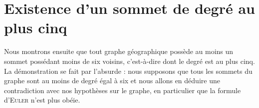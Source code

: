 \section{Existence d'un sommet de degré au plus cinq}\label{Existence}

Nous montrons ensuite que tout graphe géographique possède au moins un sommet possédant moins de six voisins, c'est-à-dire dont le degré est au plus cinq. La démonstration se fait par l'absurde : nous supposons que tous les sommets du graphe sont au moins de degré égal à six et nous allons en déduire une contradiction avec nos hypothèses sur le graphe, en particulier que la formule d'\textsc{Euler} n'est plus obéie.


